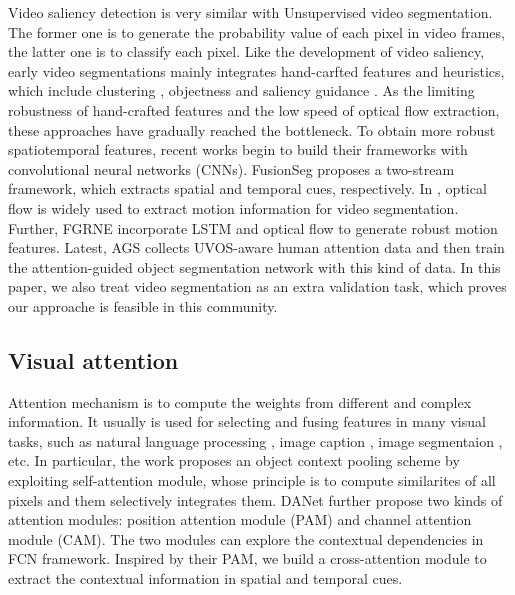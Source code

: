 \documentclass[12pt]{article}
\begin{document}
Video saliency detection is very similar with Unsupervised video segmentation. The former one is to generate the probability value of each pixel in video frames, the latter one is to classify each pixel. Like the development of video saliency, early video segmentations mainly integrates hand-carfted features and heuristics, which include clustering \cite{keuper2015motion,brox2010object,chang2013video}, objectness \cite{lee2011key,ma2012maximum,koh2017primary,li2018instance} and saliency guidance \cite{hu2018unsupervised,wang2015consistent,wang2015robust}. As the limiting robustness of hand-crafted features and the low speed of optical flow extraction, these approaches have gradually reached the bottleneck. To obtain more robust spatiotemporal features, recent works begin to build their frameworks with convolutional neural networks (CNNs). FusionSeg \cite{jain2017fusionseg} proposes a two-stream framework, which extracts spatial and temporal cues, respectively. In \cite{perazzi2017learning,Tokmakov_2017_CVPR,Cheng_2017_ICCV}, optical flow is widely used to extract motion information for video segmentation. Further, FGRNE \cite{fgrne} incorporate LSTM and optical flow to generate robust motion features. Latest, AGS \cite{AGS} collects UVOS-aware human attention data and then train the attention-guided object segmentation network with this kind of data. In this paper, we also treat video segmentation as an extra validation task, which proves our approache is feasible in this community.  

\subsection{Visual attention}

Attention mechanism is to compute the weights from different and complex information. It usually is used for selecting and fusing features in many visual tasks, such as natural language processing \cite{lin2017structured, vaswani2017attention}, image caption \cite{chen2017sca,lu2016hierarchical}, image segmentaion \cite{fu2019dual,yuan2018ocnet}, etc. In particular, the work \cite{yuan2018ocnet} proposes an object context pooling scheme by exploiting self-attention module, whose principle is to compute similarites of all pixels and them selectively integrates them. DANet \cite{fu2019dual} further propose two kinds of attention modules: position attention module (PAM) and channel attention module (CAM). The two modules can explore the contextual dependencies in FCN framework. Inspired by their PAM, we build a cross-attention module to extract the contextual information in spatial and temporal cues. 
\end{document}

